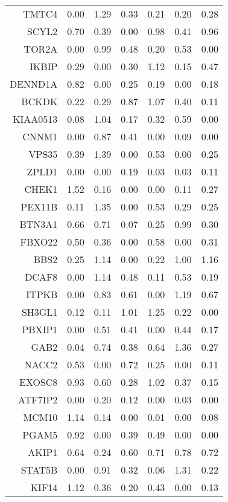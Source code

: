 \begin{longtable}{rrrrrrr}
  TMTC4 & 0.00 & 1.29 & 0.33 & 0.21 & 0.20 & 0.28 \\ 
  SCYL2 & 0.70 & 0.39 & 0.00 & 0.98 & 0.41 & 0.96 \\ 
  TOR2A & 0.00 & 0.99 & 0.48 & 0.20 & 0.53 & 0.00 \\ 
  IKBIP & 0.29 & 0.00 & 0.30 & 1.12 & 0.15 & 0.47 \\ 
  DENND1A & 0.82 & 0.00 & 0.25 & 0.19 & 0.00 & 0.18 \\ 
  BCKDK & 0.22 & 0.29 & 0.87 & 1.07 & 0.40 & 0.11 \\ 
  KIAA0513 & 0.08 & 1.04 & 0.17 & 0.32 & 0.59 & 0.00 \\ 
  CNNM1 & 0.00 & 0.87 & 0.41 & 0.00 & 0.09 & 0.00 \\ 
  VPS35 & 0.39 & 1.39 & 0.00 & 0.53 & 0.00 & 0.25 \\ 
  ZPLD1 & 0.00 & 0.00 & 0.19 & 0.03 & 0.03 & 0.11 \\ 
  CHEK1 & 1.52 & 0.16 & 0.00 & 0.00 & 0.11 & 0.27 \\ 
  PEX11B & 0.11 & 1.35 & 0.00 & 0.53 & 0.29 & 0.25 \\ 
  BTN3A1 & 0.66 & 0.71 & 0.07 & 0.25 & 0.99 & 0.30 \\ 
  FBXO22 & 0.50 & 0.36 & 0.00 & 0.58 & 0.00 & 0.31 \\ 
  BBS2 & 0.25 & 1.14 & 0.00 & 0.22 & 1.00 & 1.16 \\ 
  DCAF8 & 0.00 & 1.14 & 0.48 & 0.11 & 0.53 & 0.19 \\ 
  ITPKB & 0.00 & 0.83 & 0.61 & 0.00 & 1.19 & 0.67 \\ 
  SH3GL1 & 0.12 & 0.11 & 1.01 & 1.25 & 0.22 & 0.00 \\ 
  PBXIP1 & 0.00 & 0.51 & 0.41 & 0.00 & 0.44 & 0.17 \\ 
  GAB2 & 0.04 & 0.74 & 0.38 & 0.64 & 1.36 & 0.27 \\ 
  NACC2 & 0.53 & 0.00 & 0.72 & 0.25 & 0.00 & 0.11 \\ 
  EXOSC8 & 0.93 & 0.60 & 0.28 & 1.02 & 0.37 & 0.15 \\ 
  ATF7IP2 & 0.00 & 0.20 & 0.12 & 0.00 & 0.03 & 0.00 \\ 
  MCM10 & 1.14 & 0.14 & 0.00 & 0.01 & 0.00 & 0.08 \\ 
  PGAM5 & 0.92 & 0.00 & 0.39 & 0.49 & 0.00 & 0.00 \\ 
  AKIP1 & 0.64 & 0.24 & 0.60 & 0.71 & 0.78 & 0.72 \\ 
  STAT5B & 0.00 & 0.91 & 0.32 & 0.06 & 1.31 & 0.22 \\ 
  KIF14 & 1.12 & 0.36 & 0.20 & 0.43 & 0.00 & 0.13 \\ 

\end{longtable}

